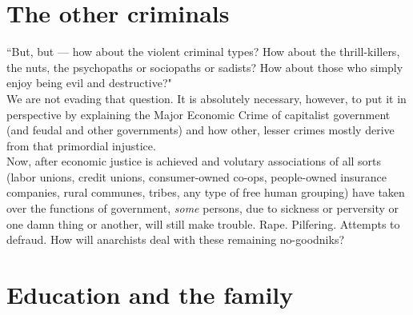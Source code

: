 \section*{The other criminals}

``But, but --- how about the violent criminal types? How about the thrill-killers, the nuts, the psychopaths or sociopaths or sadists? How about those who simply enjoy being evil and destructive?"\\
We are not evading that question. It is absolutely necessary, however, to put it in perspective by explaining the Major Economic Crime of capitalist government (and feudal and other governments) and how other, lesser crimes mostly derive from that primordial injustice.\\
Now, after economic justice is achieved and volutary associations of all sorts (labor unions, credit unions, consumer-owned co-ops, people-owned insurance companies, rural communes, tribes, any type of free human grouping) have taken over the functions of government, \emph{some} persons, due to sickness or perversity or one damn thing or another, will still make trouble. Rape. Pilfering. Attempts to defraud. How will anarchists deal with these remaining no-goodniks?

\section*{Education and the family}

